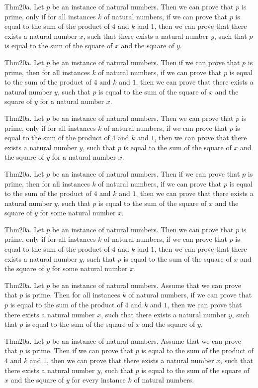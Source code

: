 \documentclass{article}
\begin{document}
Thm20a. Let $p$ be an instance of natural numbers. Then we can prove that $p$ is prime, only if for all instances $k$ of natural numbers, if we can prove that $p$ is equal to the sum of the product of $4$ and $k$ and $1$, then we can prove that there exists a natural number $x$, such that there exists a natural number $y$, such that $p$ is equal to the sum of the square of $x$ and the square of $y$.

Thm20a. Let $p$ be an instance of natural numbers. Then if we can prove that $p$ is prime, then for all instances $k$ of natural numbers, if we can prove that $p$ is equal to the sum of the product of $4$ and $k$ and $1$, then we can prove that there exists a natural number $y$, such that $p$ is equal to the sum of the square of $x$ and the square of $y$ for a natural number $x$.

Thm20a. Let $p$ be an instance of natural numbers. Then we can prove that $p$ is prime, only if for all instances $k$ of natural numbers, if we can prove that $p$ is equal to the sum of the product of $4$ and $k$ and $1$, then we can prove that there exists a natural number $y$, such that $p$ is equal to the sum of the square of $x$ and the square of $y$ for a natural number $x$.

Thm20a. Let $p$ be an instance of natural numbers. Then if we can prove that $p$ is prime, then for all instances $k$ of natural numbers, if we can prove that $p$ is equal to the sum of the product of $4$ and $k$ and $1$, then we can prove that there exists a natural number $y$, such that $p$ is equal to the sum of the square of $x$ and the square of $y$ for some natural number $x$.

Thm20a. Let $p$ be an instance of natural numbers. Then we can prove that $p$ is prime, only if for all instances $k$ of natural numbers, if we can prove that $p$ is equal to the sum of the product of $4$ and $k$ and $1$, then we can prove that there exists a natural number $y$, such that $p$ is equal to the sum of the square of $x$ and the square of $y$ for some natural number $x$.

Thm20a. Let $p$ be an instance of natural numbers. Assume that we can prove that $p$ is prime. Then for all instances $k$ of natural numbers, if we can prove that $p$ is equal to the sum of the product of $4$ and $k$ and $1$, then we can prove that there exists a natural number $x$, such that there exists a natural number $y$, such that $p$ is equal to the sum of the square of $x$ and the square of $y$.

Thm20a. Let $p$ be an instance of natural numbers. Assume that we can prove that $p$ is prime. Then if we can prove that $p$ is equal to the sum of the product of $4$ and $k$ and $1$, then we can prove that there exists a natural number $x$, such that there exists a natural number $y$, such that $p$ is equal to the sum of the square of $x$ and the square of $y$ for every instance $k$ of natural numbers.
\end{document}
